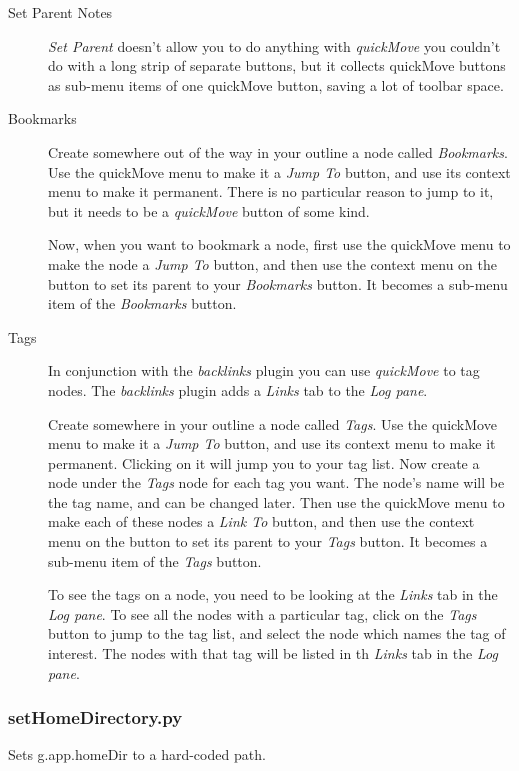 \documentclass[a4paper,10pt,english]{sphinxmanual}
\begin{document}
\begin{description}
\item[{Set Parent Notes}] \leavevmode
\emph{Set Parent} doesn't allow you to do anything with \emph{quickMove} you couldn't
do with a long strip of separate buttons, but it collects quickMove buttons
as sub-menu items of one quickMove button, saving a lot of toolbar space.

\item[{Bookmarks}] \leavevmode
Create somewhere out of the way in your outline a node called
\emph{Bookmarks}. Use the quickMove menu to make it a \emph{Jump To} button, and use its
context menu to make it permanent. There is no particular reason to jump to
it, but it needs to be a \emph{quickMove} button of some kind.

Now, when you want to bookmark a node, first use the quickMove menu to make
the node a \emph{Jump To} button, and then use the context menu on the button to
set its parent to your \emph{Bookmarks} button.  It becomes a sub-menu item
of the \emph{Bookmarks} button.

\item[{Tags}] \leavevmode
In conjunction with the \emph{backlinks} plugin you can use \emph{quickMove} to
tag nodes.   The \emph{backlinks} plugin adds a \emph{Links} tab to the \emph{Log pane}.

Create somewhere in your outline a node called \emph{Tags}. Use the quickMove menu
to make it a \emph{Jump To} button, and use its context menu to make it permanent.
Clicking on it will jump you to your tag list. Now create a node under the
\emph{Tags} node for each tag you want. The node's name will be the tag name, and
can be changed later. Then use the quickMove menu to make each of these nodes
a \emph{Link To} button, and then use the context menu on the button to set its
parent to your \emph{Tags} button. It becomes a sub-menu item of the \emph{Tags} button.

To see the tags on a node, you need to be looking at the \emph{Links} tab in the
\emph{Log pane}.  To see all the nodes with a particular tag, click on the \emph{Tags}
button to jump to the tag list, and select the node which names the tag of
interest.  The nodes with that tag will be listed in th \emph{Links} tab in the
\emph{Log pane}.

\end{description}


\subsubsection{setHomeDirectory.py}
\label{plugins:sethomedirectory-py}
Sets g.app.homeDir to a hard-coded path.
\end{document}
